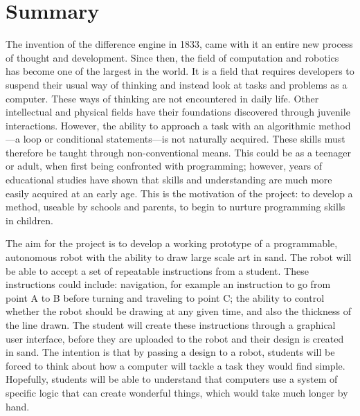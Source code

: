 
\chapter{Summary}\label{summary,conclusion}\label{section \thechapter}
\glsresetall


\label{summary: why}\label{summary: introduction}
The invention of the difference engine in 1833, came with it an entire new process of thought and development. Since then, the field of computation and robotics has become one of the largest in the world. It is a field that requires developers to suspend their usual way of thinking and instead look at tasks and problems as a computer. These ways of thinking are not encountered in daily life. Other intellectual and physical fields have their foundations discovered through juvenile interactions. However, the ability to approach a task with an algorithmic method---a loop or conditional statements---is not naturally acquired. These skills must therefore be taught through non-conventional means. This could be as a teenager or adult, when first being confronted with programming; however, years of educational studies have shown that skills and understanding are much more easily acquired at an early age. This is the motivation of the \SandE project: to develop a method, useable by schools and parents, to begin to nurture programming skills in children.

The aim for the \SandE project is to develop a working prototype of a programmable, autonomous robot with the ability to draw large scale art in sand. The robot will be able to accept a set of repeatable instructions from a student. These instructions could include: navigation, for example an instruction to go from point A to B before turning and traveling to point C; the ability to control whether the robot should be drawing at any given time, and also the thickness of the line drawn. The student will create these instructions through a graphical user interface, before they are uploaded to the robot and their design is created in sand. The intention is that by passing a design to a robot, students will be forced to think about how a computer will tackle a task they would find simple. Hopefully, students will be able to understand that computers use a system of specific logic that can create wonderful things, which would take much longer by hand.
